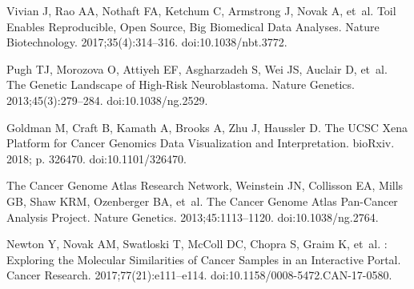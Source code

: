 \documentclass[10pt,letterpaper]{article}
\begin{document}
\nolinenumbers

%
%
%

%
%


\begin{thebibliography}{10}

	Vivian J, Rao AA, Nothaft FA, Ketchum C, Armstrong J, Novak A, et~al.
	\newblock Toil Enables Reproducible, Open Source, Big Biomedical Data Analyses.
	\newblock Nature Biotechnology. 2017;35(4):314--316.
	\newblock doi:{10.1038/nbt.3772}.

	Pugh TJ, Morozova O, Attiyeh EF, Asgharzadeh S, Wei JS, Auclair D, et~al.
	\newblock The Genetic Landscape of High-Risk Neuroblastoma.
	\newblock Nature Genetics. 2013;45(3):279--284.
	\newblock doi:{10.1038/ng.2529}.

	Goldman M, Craft B, Kamath A, Brooks A, Zhu J, Haussler D.
	\newblock The {{UCSC Xena Platform}} for Cancer Genomics Data Visualization and
	Interpretation.
	\newblock bioRxiv. 2018; p. 326470.
	\newblock doi:{10.1101/326470}.

	{The Cancer Genome Atlas Research Network}, Weinstein JN, Collisson EA, Mills
	GB, Shaw KRM, Ozenberger BA, et~al.
	\newblock The {{Cancer Genome Atlas Pan}}-{{Cancer}} Analysis Project.
	\newblock Nature Genetics. 2013;45:1113--1120.
	\newblock doi:{10.1038/ng.2764}.

	Newton Y, Novak AM, Swatloski T, McColl DC, Chopra S, Graim K, et~al.
	: {{Exploring}} the {{Molecular Similarities}} of
	{{Cancer Samples}} in an {{Interactive Portal}}.
	\newblock Cancer Research. 2017;77(21):e111--e114.
	\newblock doi:{10.1158/0008-5472.CAN-17-0580}.


\end{thebibliography}
\end{document}
